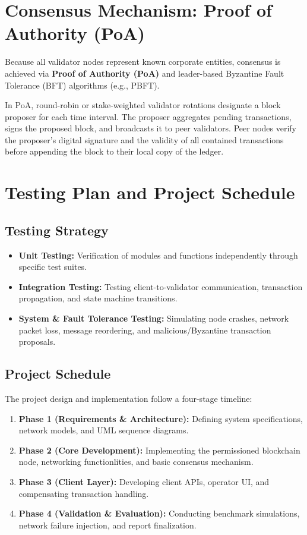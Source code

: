 \documentclass[11pt,a4paper]{memoir}
\begin{document}
\section{Consensus Mechanism: Proof of Authority (PoA)}
Because all validator nodes represent known corporate entities, consensus is achieved via \textbf{Proof of Authority (PoA)} and leader-based Byzantine Fault Tolerance (BFT) algorithms (e.g., PBFT). 

In PoA, round-robin or stake-weighted validator rotations designate a block proposer for each time interval. The proposer aggregates pending transactions, signs the proposed block, and broadcasts it to peer validators. Peer nodes verify the proposer's digital signature and the validity of all contained transactions before appending the block to their local copy of the ledger.

\section{Testing Plan and Project Schedule}
\subsection{Testing Strategy}
\begin{itemize}
    \item \textbf{Unit Testing:} Verification of modules and functions independently through specific test suites. 
    \item \textbf{Integration Testing:} Testing client-to-validator communication, transaction propagation, and state machine transitions.
    \item \textbf{System \& Fault Tolerance Testing:} Simulating node crashes, network packet loss, message reordering, and malicious/Byzantine transaction proposals.
\end{itemize}

\subsection{Project Schedule}
The project design and implementation follow a four-stage timeline:
\begin{enumerate}
    \item \textbf{Phase 1 (Requirements \& Architecture):} Defining system specifications, network models, and UML sequence diagrams.
    \item \textbf{Phase 2 (Core Development):} Implementing the permissioned blockchain node, networking functionlities, and basic consensus mechanism.
    \item \textbf{Phase 3 (Client Layer):} Developing client APIs, operator UI, and compensating transaction handling.
    \item \textbf{Phase 4 (Validation \& Evaluation):} Conducting benchmark simulations, network failure injection, and report finalization.
\end{enumerate}
\end{document}
